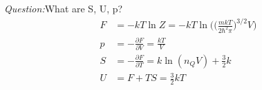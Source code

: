 \documentclass[a4paper, 11pt]{article}
\begin{document}
	
\noindent\textit{Question:}What are S, U, p? 
	\begin{align*}
		F &= -kT\ln Z = -kT \ln \Big(\Big(\frac{mkT}{2\hbar^2\pi}\Big)^{3/2}V\Big)  \\ 
		p &= -\frac{\partial F}{\partial V} = \frac{kT}{V} \\ 
		S &= -\frac{\partial F}{\partial T} = k\ln(n_Q V) + \frac{3}{2}k \\ 
		U &= F + TS = \frac{3}{2}kT 
	\end{align*}
	
	
	
	
	
	
	
	
	
	
	
	
	
	
	
	
	
	
	
	
	
	
	
	
	
	
	
	
	
	
\end{document}
